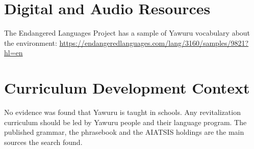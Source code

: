 \documentclass[12pt]{article}
\begin{document}
\section{Digital and Audio Resources}
The Endangered Languages Project has a sample of Yawuru vocabulary about the environment: \url{https://endangeredlanguages.com/lang/3160/samples/9821?hl=en}

\section{Curriculum Development Context}
No evidence was found that Yawuru is taught in schools. Any revitalization curriculum should be led by Yawuru people and their language program. The published grammar, the phrasebook and the AIATSIS holdings are the main sources the search found.
\end{document}
